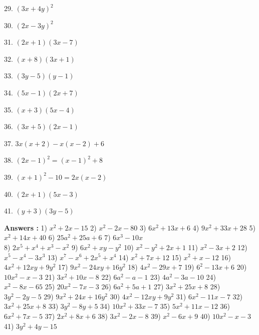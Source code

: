 \documentclass{article}
\begin{document}
\begin{enumerate}
\begin{paracol}{3}
		\item[29.] $(3x+4y)^2$
		\item[30.] $(2x-3y)^2$
		\item[31.] $(2x+1)(3x-7)$
		\item[32.] $(x+8)(3x+1)$
		\item[33.] $(3y-5)(y-1)$
		\item[34.] $(5x-1)(2x+7)$
		\item[35.] $(x+3)(5x-4)$
		\item[36.] $(3x+5)(2x-1)$
		\item[37.] $3x(x+2)-x(x-2)+6$
		\item[38.] $(2x-1)^2 = (x-1)^2 + 8$
		\item[39.] $(x+1)^2 - 10 = 2x(x-2)$
		\item[40.] $(2x+1)(5x-3)$
		\item[41.] $(y+3)(3y-5)$
	\end{paracol}
\end{enumerate}
{\small \textbf{Answers : }}
	{\footnotesize 1) $x^2 + 2x - 15$} {\footnotesize 2) $x^2 - 2x - 80$} {\footnotesize 3) $6x^2 + 13x + 6$} {\footnotesize 4) $9x^2 + 33x + 28$} {\footnotesize 5) $x^2 + 14x + 40$} {\footnotesize 6) $25a^2 + 25a + 6$} {\footnotesize 7) $6x^3 - 10x$}\\{\footnotesize 8) $2x^5 + x^4 + x^3 - x^2$} {\footnotesize 9) $6x^2 + xy - y^2$} {\footnotesize 10) $x^2 - y ^2+ 2x + 1$} {\footnotesize 11) $x^2 - 3x + 2$} {\footnotesize 12) $x^5 - x^4 - 3x^3$} {\footnotesize 13) $x^7 - x^6 + 2x^5 + x^4$} {\footnotesize 14) $x^2 + 7x + 12$} {\footnotesize 15) $x^2 + x - 12$} {\footnotesize 16) $4x^2 + 12xy + 9y^2$} {\footnotesize 17) $9x^2 - 24xy + 16y^2$} {\footnotesize 18) $4x^2 - 29x + 7$} {\footnotesize 19) $6^2 - 13x + 6$} {\footnotesize 20) $10x^2 - x - 3$} {\footnotesize 21) $3x^2 + 10x - 8$} {\footnotesize 22) $6a^2 - a - 1$} {\footnotesize 23) $4a^2 - 3a - 10$} {\footnotesize 24) $x^2 - 8x - 65$} {\footnotesize 25) $20x^2 - 7x - 3$} {\footnotesize 26) $6a^2 + 5a + 1$} {\footnotesize 27) $3x^2 + 25x + 8$} {\footnotesize 28) $3y^2 - 2y - 5$} {\footnotesize 29) $9x^2 + 24x + 16y^2$} {\footnotesize 30) $4x^2 - 12xy + 9y^2$} {\footnotesize 31) $6x^2 - 11x - 7$} {\footnotesize 32) $3x^2 + 25x + 8$} {\footnotesize 33) $3y^2 - 8y + 5$} {\footnotesize 34) $10x^2 + 33x - 7$} {\footnotesize 35) $5x^2 + 11x - 12$} {\footnotesize 36) $6x^2 + 7x - 5$} {\footnotesize 37) $2x^2 + 8x + 6$} {\footnotesize 38) $3x^2 - 2x - 8$} {\footnotesize 39) $x^2 - 6x + 9$} {\footnotesize 40) $10x^2 - x - 3$} {\footnotesize 41) $3y^2 + 4y - 15$}
\end{document}
